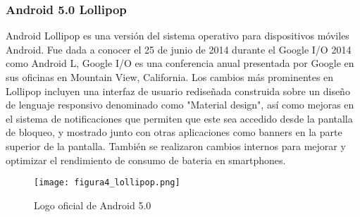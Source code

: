 		\newpage
		\thispagestyle{plain}
		
		\subsubsection{Android 5.0 Lollipop}
			\par 
				Android Lollipop es una versión del sistema operativo para dispositivos móviles Android. Fue dada a conocer el 25 de junio de 2014 durante el Google I/O 2014 como Android L, Google I/O es una conferencia anual presentada por Google en sus oficinas en Mountain View, California.
				Los cambios más prominentes en Lollipop incluyen una interfaz de usuario rediseñada construida sobre un diseño de lenguaje responsivo denominado como "Material design", así como mejoras en el sistema de notificaciones que permiten que este sea accedido desde la pantalla de bloqueo, y mostrado junto con otras aplicaciones como banners en la parte superior de la pantalla. También se realizaron cambios internos para mejorar y optimizar el rendimiento de consumo de bateria en smartphones.
				
			\begin{figure}[h]
				\centering
				\texttt{[image: figura4\_lollipop.png]}
				\caption{Logo oficial de Android 5.0}
			\end{figure}
		
		\newpage
		\thispagestyle{plain}
